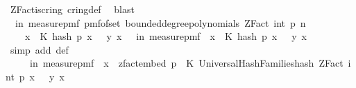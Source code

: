 \begin{isabellebody}
\ ZFact{\isacharunderscore}{\kern0pt}is{\isacharunderscore}{\kern0pt}cring\ cring{\isacharunderscore}{\kern0pt}def\ \isamarkupfalse%
\ blast\isanewline
\isanewline
\ \ \isamarkupfalse%
\ {\isachardoublequoteopen}{\isasymP}{\isacharparenleft}{\kern0pt}{\isasymomega}\ in\ measure{\isacharunderscore}{\kern0pt}pmf\ {\isacharparenleft}{\kern0pt}pmf{\isacharunderscore}{\kern0pt}of{\isacharunderscore}{\kern0pt}set\ {\isacharparenleft}{\kern0pt}bounded{\isacharunderscore}{\kern0pt}degree{\isacharunderscore}{\kern0pt}polynomials\ {\isacharparenleft}{\kern0pt}ZFact\ {\isacharparenleft}{\kern0pt}int\ p{\isacharparenright}{\kern0pt}{\isacharparenright}{\kern0pt}\ n{\isacharparenright}{\kern0pt}{\isacharparenright}{\kern0pt}{\isachardot}{\kern0pt}\ \isanewline
\ \ \ \ {\isacharparenleft}{\kern0pt}{\isasymforall}x\ {\isasymin}\ K{\isachardot}{\kern0pt}\ hash\ p\ x\ {\isasymomega}\ {\isacharequal}{\kern0pt}\ {\isacharparenleft}{\kern0pt}y\ x{\isacharparenright}{\kern0pt}{\isacharparenright}{\kern0pt}{\isacharparenright}{\kern0pt}\ {\isacharequal}{\kern0pt}\ {\isasymP}{\isacharparenleft}{\kern0pt}{\isasymomega}\ in\ measure{\isacharunderscore}{\kern0pt}pmf\ {\isasymOmega}{\isachardot}{\kern0pt}\ {\isacharparenleft}{\kern0pt}{\isasymforall}x\ {\isasymin}\ K{\isachardot}{\kern0pt}\ hash\ p\ x\ {\isasymomega}\ {\isacharequal}{\kern0pt}\ {\isacharparenleft}{\kern0pt}y\ x{\isacharparenright}{\kern0pt}{\isacharparenright}{\kern0pt}{\isacharparenright}{\kern0pt}{\isachardoublequoteclose}\isanewline
\ \ \ \ \isamarkupfalse%
\ {\isacharparenleft}{\kern0pt}simp\ add{\isacharcolon}{\kern0pt}\ {\isasymOmega}{\isacharunderscore}{\kern0pt}def{\isacharparenright}{\kern0pt}\isanewline
\ \ \isamarkupfalse%
\ \isamarkupfalse%
\ {\isachardoublequoteopen}{\isachardot}{\kern0pt}{\isachardot}{\kern0pt}{\isachardot}{\kern0pt}\ {\isacharequal}{\kern0pt}\isanewline
\ \ \ \ {\isasymP}{\isacharparenleft}{\kern0pt}{\isasymomega}\ in\ measure{\isacharunderscore}{\kern0pt}pmf\ {\isasymOmega}{\isachardot}{\kern0pt}\ {\isacharparenleft}{\kern0pt}{\isasymforall}x\ {\isasymin}\ zfact{\isacharunderscore}{\kern0pt}embed\ p\ {\isacharbackquote}{\kern0pt}\ K{\isachardot}{\kern0pt}\ Universal{\isacharunderscore}{\kern0pt}Hash{\isacharunderscore}{\kern0pt}Families{\isachardot}{\kern0pt}hash\ {\isacharparenleft}{\kern0pt}ZFact\ {\isacharparenleft}{\kern0pt}int\ p{\isacharparenright}{\kern0pt}{\isacharparenright}{\kern0pt}\ x\ {\isasymomega}\ {\isacharequal}{\kern0pt}\ y{\isacharprime}{\kern0pt}\ x{\isacharparenright}{\kern0pt}{\isacharparenright}{\kern0pt}{\isachardoublequoteclose}\isanewline

\end{isabellebody}
